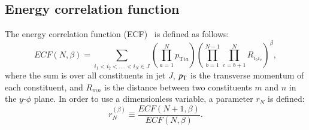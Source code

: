 
\subsection{Energy correlation function \label{sec:ecf}}
The energy correlation function (ECF)~\cite{Larkoski:2013eya} is defined as follows: 
\begin{equation} \label{eq:ECF_Modified}
ECF(N,\beta)=\sum_{i_{1}<i_{2}<....<i_{N}\in J} \left(\prod_{a=1}^{N}p_{\mathrm{T}ia}\right)\left(\prod_{b=1}^{N-1}\prod_{c=b+1}^{N} R_{i_{b}i_{c}}\right)^{\beta},
\end{equation}
where the sum is over all constituents in jet $J$, $p_{\mathrm{T}}$ is the transverse 
momentum of each constituent, and $R_{mn}$ is the distance between two constituents $m$ and $n$ in the $y$-$\phi$ plane.  
In order to use a dimensionless variable, a parameter $r_{N}$ is defined:
\begin{equation} \label{eq:ECF_ratio}
r_{N}^{(\beta)}\equiv\frac{ECF(N+1,\beta)}{ECF(N,\beta)}.
\end{equation}

